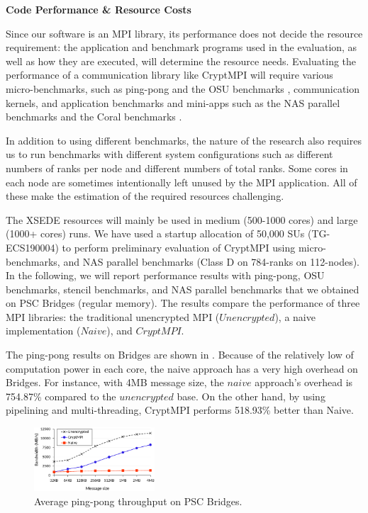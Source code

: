 \centerline{\Large\bfseries Code Performance \& Resource Costs}

Since our software is an MPI library, its performance does not decide the resource requirement:
the application and benchmark programs used in the evaluation, as well as how they are executed,
will determine the resource needs. Evaluating the performance of a communication library like
CryptMPI will require various micro-benchmarks, such as ping-pong and the OSU benchmarks \cite{OSUBM},
communication kernels, and application benchmarks and mini-apps such as the NAS parallel benchmarks
\cite{Bailey:1991:NPB:2748645.2748648} and the Coral benchmarks \cite{CORAL}. 

In addition to using different benchmarks, the nature of the research also requires us to
run benchmarks with different system configurations such as different numbers of ranks per node
and different numbers of total ranks. Some cores in each node are sometimes intentionally left
unused by the MPI application. All of these make the estimation of the required resources
challenging.

The XSEDE resources will mainly be used in medium (500-1000 cores) and large
(1000+ cores) runs. We have used a startup allocation of 50,000 SUs (TG-ECS190004) to perform
preliminary evaluation of CryptMPI using micro-benchmarks, and
NAS parallel benchmarks (Class D on 784-ranks on 112-nodes). 
In the following, we will report performance results with ping-pong, OSU benchmarks, stencil
benchmarks, and NAS parallel benchmarks that we obtained on
PSC Bridges (regular memory). The results compare the performance of
three MPI libraries: the traditional unencrypted
MPI ($Unencrypted$), a naive implementation ($Naive$), and $CryptMPI$. 

The ping-pong results on Bridges are shown in . Because of
the relatively low of computation power in each core,
the naive approach has a very high overhead on Bridges.
For instance, with 4MB message size,
the $naive$ approach's overhead is 754.87\% compared to the $unencrypted$
base. On the other hand, by using pipelining and multi-threading, CryptMPI performs
518.93\% better than Naive.

\begin{figure}[htb]
	\centering
		\includegraphics[width=0.4\textwidth]{graphs/infini-xsede-pingpong.eps}
	\caption{Average %
	ping-pong throughput on PSC Bridges.}
	\label{fig:xsede_pingpong}
	\vspace{-2ex}
\end{figure}

